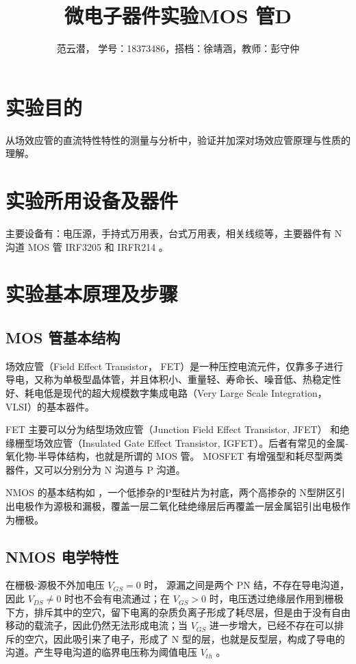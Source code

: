 \documentclass[lang=cn,11pt,a4paper,cite=authoryear]{elegantpaper}
\title{微电子器件实验\quad MOS 管D}
\author{范云潜， 学号：18373486，搭档：徐靖涵，教师：彭守仲}
\institute{微电子学院 184111 班}
\date{\zhdate{2020/10/19}}
\begin{document}
\maketitle


\section{实验目的}

从场效应管的直流特性特性的测量与分析中，验证并加深对场效应管原理与性质的理解。

\section{实验所用设备及器件}

主要设备有：电压源，手持式万用表，台式万用表，相关线缆等，主要器件有 N 沟道 MOS 管 IRF3205 和 IRFR214 。

\section{实验基本原理及步骤}

\subsection{MOS 管基本结构}

场效应管（Field Effect Transistor， FET）是一种压控电流元件，仅靠多子进行导电，又称为单极型晶体管，并且体积小、重量轻、寿命长、噪音低、热稳定性好、耗电低是现代的超大规模数字集成电路（Very Large Scale Integration， VLSI）的基本器件。

FET 主要可以分为结型场效应管（Junction Field Effect Transistor, JFET） 和绝缘栅型场效应管（Insulated Gate Effect Transistor, IGFET）。后者有常见的金属-氧化物-半导体结构，也就是所谓的 MOS 管。 MOSFET 有增强型和耗尽型两类器件，又可以分别分为 N 沟道与 P 沟道。

NMOS 的基本结构如  ，一个低掺杂的P型硅片为衬底，两个高掺杂的 N型阱区引出电极作为源极和漏极，覆盖一层二氧化硅绝缘层后再覆盖一层金属铝引出电极作为栅极。


\subsection{NMOS 电学特性} 

在栅极-源极不外加电压 \(V_{GS} = 0\) 时， 源漏之间是两个 PN 结，不存在导电沟道，因此 \(V_{DS} \neq 0\) 时也不会有电流通过；在 \(V_{GS} > 0\) 时，电压透过绝缘层作用到栅极下方，排斥其中的空穴，留下电离的杂质负离子形成了耗尽层，但是由于没有自由移动的载流子，因此仍然无法形成电流；当 \(V_{GS}\) 进一步增大，已经不存在可以排斥的空穴，因此吸引来了电子，形成了 N 型的层，也就是反型层，构成了导电的沟道。产生导电沟道的临界电压称为阈值电压 \(V_{th}\) 。
\end{document}

